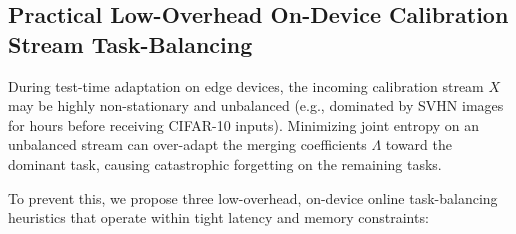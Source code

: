 \subsection{Practical Low-Overhead On-Device Calibration Stream Task-Balancing}
\label{subsec:on_device_balancing}

During test-time adaptation on edge devices, the incoming calibration stream $X$ may be highly non-stationary and unbalanced (e.g., dominated by SVHN images for hours before receiving CIFAR-10 inputs). Minimizing joint entropy on an unbalanced stream can over-adapt the merging coefficients $\Lambda$ toward the dominant task, causing catastrophic forgetting on the remaining tasks.

To prevent this, we propose three low-overhead, on-device online task-balancing heuristics that operate within tight latency and memory constraints:

